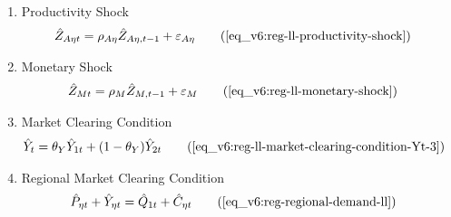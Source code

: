 \documentclass[../thesis.tex]{subfiles}
\begin{document}
{\begin{itemize}
\begin{enumerate}
		\item Productivity Shock
		\begin{alignat}{2}
			\hat{Z}_{A\eta t} &= \rho_{A\eta} \hat{Z}_{A\eta, t-1} + \varepsilon_{A\eta} \tag{\ref{eq_v6:reg-ll-productivity-shock}}
		\end{alignat}
		
		\item Monetary Shock
		\begin{alignat}{2}
			\hat{Z}_{Mt} &= \rho_M \hat{Z}_{M,t-1} + \varepsilon_{M} \tag{\ref{eq_v6:reg-ll-monetary-shock}}
		\end{alignat}
		
		\item Market Clearing Condition
		\begin{align}
			\hat{Y}_{t} &= \theta_{Y} \hat{Y}_{1t} + (1-\theta_{Y}) \hat{Y}_{2t} \tag{\ref{eq_v6:reg-ll-market-clearing-condition-Yt-3}}
		\end{align}
		
		\item Regional Market Clearing Condition
		\begin{align}
			\hat{P}_{\eta t} + \hat{Y}_{\eta t} &= \hat{Q}_{1t} + \hat{C}_{\eta t} \tag{\ref{eq_v6:reg-regional-demand-ll}}
		\end{align}
		
	\end{enumerate}
	
\end{itemize}

} %

\newpage
\end{document}
